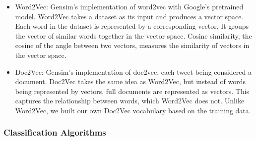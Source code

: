 \begin{itemize}
    \item Word2Vec: Gensim's implementation of word2vec with Google's pretrained model. Word2Vec takes a dataset as its input and produces a vector space. Each word in the dataset is represented by a corresponding vector. It groups the vector of similar words together in the vector space. Cosine similarity, the cosine of the angle between two vectors, measures the similarity of vectors in the vector space.    
    \item Doc2Vec: Gensim's implementation of doc2vec, each tweet being considered a document. Doc2Vec takes the same idea as Word2Vec, but instead of words being represented by vectors, full documents are represented as vectors. This captures the relationship between words, which Word2Vec does not. Unlike Word2Vec, we built our own Doc2Vec vocabulary based on the training data.
\end{itemize}

\subsubsection{Classification Algorithms}

